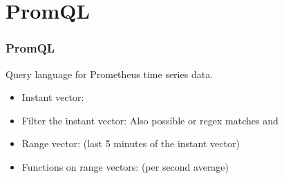 \section{PromQL}
\begin{frame}
  \frametitle{PromQL} 
 
  Query language for Prometheus time series data.
 
  \begin{itemize}
    \item<1-> Instant vector:\\
    \item<2-> Filter the instant vector:
       Also possible \inlinecode{!=} or regex matches \inlinecode{=~} and \inlinecode{!~}
    \item<3-> Range vector: (last 5 minutes of the instant vector)\\
    \item<4-> Functions on range vectors: (per second average)\\
  \end{itemize}


\end{frame}
